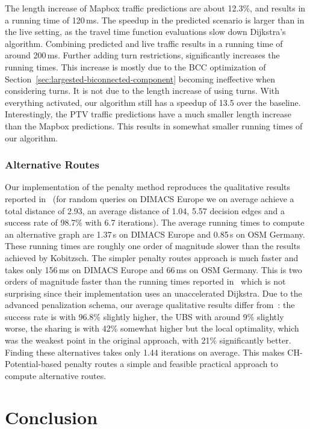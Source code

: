 \documentclass[manuscript,review]{acmart}
\begin{document}
The length increase of Mapbox traffic predictions are about 12.3\%, and results in a running time of 120\,ms.
The speedup in the predicted scenario is larger than in the live setting, as the travel time function evaluations slow down Dijkstra's algorithm.
Combining predicted and live traffic results in a running time of around 200\,ms.
Further adding turn restrictions, significantly increases the running times.
This increase is mostly due to the BCC optimization of Section~\ref{sec:largested-biconnected-component} becoming ineffective when considering turns.
It is not due to the length increase of using turns.
With everything activated, our algorithm still has a speedup of 13.5 over the baseline.
Interestingly, the PTV traffic predictions have a much smaller length increase than the Mapbox predictions.
This results in somewhat smaller running times of our algorithm.

\subsubsection{Alternative Routes}

Our implementation of the penalty method reproduces the qualitative results reported in~\cite{kobitzsch2015alternative} (for random queries on DIMACS Europe we on average achieve a total distance of 2.93, an average distance of 1.04, 5.57 decision edges and a success rate of 98.7\% with 6.7 iterations).
The average running times to compute an alternative graph are 1.37\,s on DIMACS Europe and 0.85\,s on OSM Germany.
These running times are roughly one order of magnitude slower than the results achieved by Kobitzsch.
The simpler penalty routes approach is much faster and takes only 156\,ms on DIMACS Europe and 66\,ms on OSM Germany.
This is two orders of magnitude faster than the running times reported in~\cite{adgw-arrn-13} which is not surprising since their implementation uses an unaccelerated Dijkstra.
Due to the advanced penalization schema, our average qualitative results differ from~\cite{adgw-arrn-13}: the success rate is with 96.8\% slightly higher, the UBS with around 9\% slightly worse, the sharing is with 42\% somewhat higher but the local optimality, which was the weakest point in the original approach, with 21\% significantly better.
Finding these alternatives takes only 1.44 iterations on average.
This makes CH-Potential-based penalty routes a simple and feasible practical approach to compute alternative routes.

\section{Conclusion}
\label{sec:conclusion}
\end{document}
